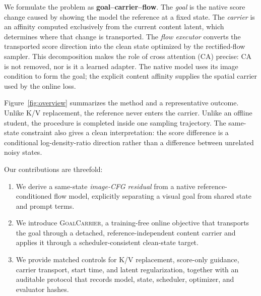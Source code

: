 \documentclass[10pt,letterpaper]{article}
\newcommand{\method}{\textsc{GoalCarrier}}
\begin{document}
We formulate the problem as \textbf{goal--carrier--flow}. The \emph{goal} is
the native score change caused by showing the model the reference at a fixed
state. The \emph{carrier} is an affinity computed exclusively from the current
content latent, which determines where that change is transported. The
\emph{flow executor} converts the transported score direction into the clean
state optimized by the rectified-flow sampler. This decomposition makes the
role of cross attention (CA) precise: CA is not removed, nor is it a learned
adapter. The native model uses its image condition to form the goal; the
explicit content affinity supplies the spatial carrier used by the online
loss.

Figure~\ref{fig:overview} summarizes the method and a representative outcome.
Unlike K/V replacement, the reference never enters the carrier. Unlike an
offline student, the procedure is completed inside one sampling trajectory.
The same-state constraint also gives a clean interpretation: the score
difference is a conditional log-density-ratio direction rather than a
difference between unrelated noisy states.

Our contributions are threefold:
\begin{enumerate}
\item We derive a same-state \emph{image-CFG residual} from a native
reference-conditioned flow model, explicitly separating a visual goal from
shared state and prompt terms.
\item We introduce \method, a training-free online objective that transports
the goal through a detached, reference-independent content carrier and applies
it through a scheduler-consistent clean-state target.
\item We provide matched controls for K/V replacement, score-only guidance,
carrier transport, start time, and latent regularization, together with an
auditable protocol that records model, state, scheduler, optimizer, and
evaluator hashes.
\end{enumerate}
\end{document}
